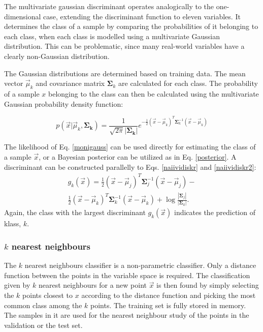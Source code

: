 \documentclass[twoside]{article}
\renewcommand{\v}[1]{\vec{#1}}
\begin{document}
\begin{multicols}{2}
The multivariate gaussian discriminant operates analogically to the one-dimensional
case, extending the discriminant function to eleven variables. It determines the class of a sample by
comparing the probabilities of it belonging to each class, when each
class is modelled using a multivariate Gaussian distribution. This can be problematic,
since many real-world variables have a clearly non-Gaussian distribution.

The Gaussian distributions are determined based on training data.
The mean vector $\v{\mu}_k$ and covariance matrix $\mathbf{\Sigma}_k$ are calculated for each class.
The probability of a sample $x$ belonging to the class can then be calculated
using the multivariate Gaussian probability density function:

\begin{equation}\label{monigauss}
 p(\v{x}|\v{\mu}_k,\mathbf{\Sigma_k}) = \frac{1}{\sqrt{2\pi} |\mathbf{\Sigma_k}|}
 e^{-\frac{1}{2}(\v{x}-\v{\mu}_k)^T \mathbf{\Sigma}_k^{-1} (\v{x}-\v{\mu}_k)}
\end{equation}

The likelihood of Eq. \eqref{monigauss} can be used directly for estimating the class of a
sample $\v{x}$, or a Bayesian posterior can be utilized as in Eq. \eqref{posterior}. 
A discriminant can be constructed parallelly to Eqs. \eqref{naiividiskr} and \eqref{naiividiskr2}:
\begin{equation}
	\begin{aligned}
	 g_k(\v{x}) = \frac{1}{2}(\v{x}-\v{\mu}_j)^T \mathbf{\Sigma}_j^{-1} (\v{x}-\v{\mu}_j) - \\
	 \frac{1}{2}(\v{x}-\v{\mu}_k)^T \mathbf{\Sigma}_k^{-1} (\v{x}-\v{\mu}_k) 
	+\log \frac{|\mathbf{\Sigma}_j|}{|\mathbf{\Sigma}_k|}.
       \end{aligned}
\end{equation}
Again, the class with the largest discriminant $g_k(\v{x})$ indicates the prediction of klass, $k$.

\subsubsection{$k$ nearest neighbours}

The $k$ nearest neighbours classifier is a non-parametric classifier. Only a
distance function between the points in the variable space is required.
The classification given by $k$ nearest neighbours for a new point $\v{x}$ is then found by simply
selecting the $k$ points closest to $x$ according to the distance function and
picking the most common class among the $k$ points. The training set is fully
stored in memory. The samples in it are used for the nearest neighbour study
of the points in the validation or the test set.


\end{multicols}
\end{document}

